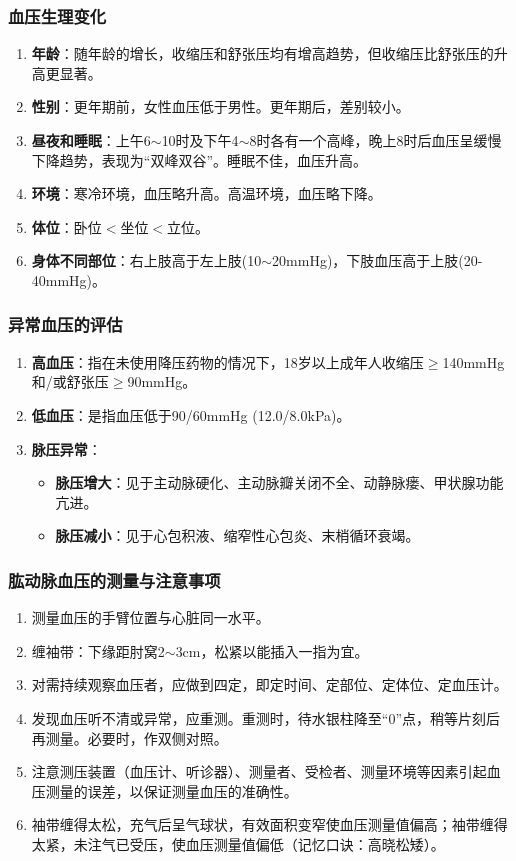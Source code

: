 \documentclass[11pt, a4paper]{ctexart}
\begin{document}
\subsubsection{血压生理变化}
\begin{enumerate}
	\item \textbf{年龄}：随年龄的增长，收缩压和舒张压均有增高趋势，但收缩压比舒张压的升高更显著。
	\item \textbf{性别}：更年期前，女性血压低于男性。更年期后，差别较小。
	\item \textbf{昼夜和睡眠}：上午6$\sim$10时及下午4$\sim$8时各有一个高峰，晚上8时后血压呈缓慢下降趋势，表现为“双峰双谷”。睡眠不佳，血压升高。
	\item \textbf{环境}：寒冷环境，血压略升高。高温环境，血压略下降。
	\item \textbf{体位}：卧位$<$坐位$<$立位。
	\item \textbf{身体不同部位}：右上肢高于左上肢(10$\sim$20mmHg)，下肢血压高于上肢(20-40mmHg)。
\end{enumerate}

\subsubsection{异常血压的评估}
\begin{enumerate}
	\item \textbf{高血压}：指在未使用降压药物的情况下，18岁以上成年人收缩压$\geq$140mmHg和/或舒张压$\geq$90mmHg。
	\item \textbf{低血压}：是指血压低于90/60mmHg (12.0/8.0kPa)。
	\item \textbf{脉压异常}：
	      \begin{itemize}
		      \item \textbf{脉压增大}：见于主动脉硬化、主动脉瓣关闭不全、动静脉瘘、甲状腺功能亢进。
		      \item \textbf{脉压减小}：见于心包积液、缩窄性心包炎、末梢循环衰竭。
	      \end{itemize}
\end{enumerate}

\subsubsection{肱动脉血压的测量与注意事项}
\begin{enumerate}
	\item 测量血压的手臂位置与心脏同一水平。
	\item 缠袖带：下缘距肘窝2$\sim$3cm，松紧以能插入一指为宜。
	\item 对需持续观察血压者，应做到四定，即定时间、定部位、定体位、定血压计。
	\item 发现血压听不清或异常，应重测。重测时，待水银柱降至“0”点，稍等片刻后再测量。必要时，作双侧对照。
	\item 注意测压装置（血压计、听诊器）、测量者、受检者、测量环境等因素引起血压测量的误差，以保证测量血压的准确性。
	\item 袖带缠得太松，充气后呈气球状，有效面积变窄使血压测量值偏高；袖带缠得太紧，未注气已受压，使血压测量值偏低（记忆口诀：高晓松矮）。
\end{enumerate}
\end{document}
